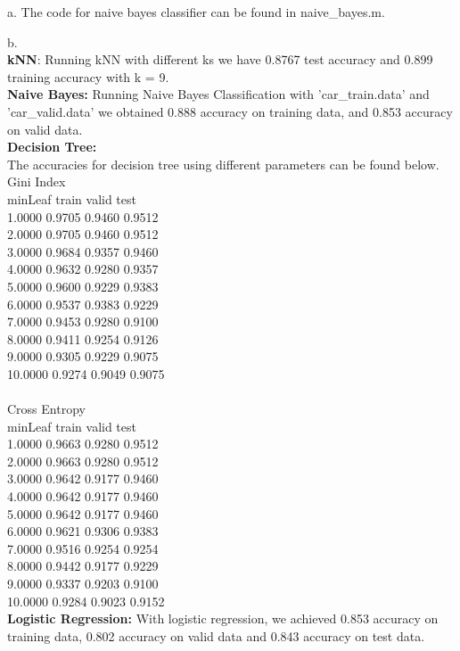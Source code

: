 \documentclass[12pt]{article}
\newenvironment{problem}[2][Problem]{\begin{trivlist}
\item[\hskip \labelsep {\bfseries #1}\hskip \labelsep {\bfseries #2}]}{\end{trivlist}}
\begin{document}
\begin{problem}{4. Comparing Classifiers in Octave}
\item{a.}
The code for naive bayes classifier can be found in naive\_bayes.m.
\item{b.\\}
\textbf{kNN}: Running kNN with different ks we have 0.8767 test accuracy and 0.899 training accuracy with k = 9.\\
\textbf{Naive Bayes:} Running Naive Bayes Classification with 'car\_train.data' and 'car\_valid.data' we obtained 0.888 accuracy on training data, and 0.853 accuracy on valid data.\\
\textbf{Decision Tree:\\}
The accuracies for decision tree using different parameters can be found below.\\
Gini Index\\
minLeaf   train     valid     test\\
1.0000    0.9705    0.9460    0.9512\\
2.0000    0.9705    0.9460    0.9512\\
3.0000    0.9684    0.9357    0.9460\\
4.0000    0.9632    0.9280    0.9357\\
5.0000    0.9600    0.9229    0.9383\\
6.0000    0.9537    0.9383    0.9229\\
7.0000    0.9453    0.9280    0.9100\\
8.0000    0.9411    0.9254    0.9126  \\
9.0000    0.9305    0.9229    0.9075\\
10.0000   0.9274    0.9049     0.9075\\
\\
Cross Entropy\\
minLeaf   train     valid     test\\
1.0000    0.9663    0.9280    0.9512\\
2.0000    0.9663    0.9280    0.9512\\
3.0000    0.9642    0.9177    0.9460\\
4.0000    0.9642    0.9177    0.9460\\
5.0000    0.9642    0.9177    0.9460\\
6.0000    0.9621    0.9306    0.9383\\
7.0000    0.9516    0.9254    0.9254\\
8.0000    0.9442    0.9177    0.9229\\
9.0000    0.9337    0.9203    0.9100\\
10.0000    0.9284    0.9023    0.9152\\
\textbf{Logistic Regression:} With logistic regression, we achieved 0.853 accuracy on training data, 0.802 accuracy on valid data and 0.843 accuracy on test data. 
\end{problem}
 
\end{document}
